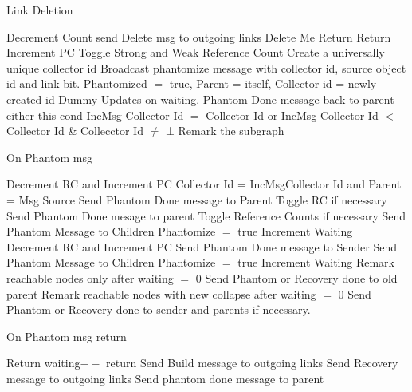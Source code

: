 \documentclass{article}
\begin{document}
\begin{algorithm}
\caption{Link Deletion}
\label{Link Deletion}
\begin{algorithmic}[1]
\State Decrement Count
\State send Delete msg to outgoing links
\EndIf
{}
\State Delete Me
\State Return
\State Return
\State Increment PC
\State Toggle Strong and Weak Reference Count
\State Create a universally unique collector id
\State Broadcast phantomize message with collector id, source object id and link bit.
\EndFor
\State Phantomized $=$ true, Parent = itself, Collector id = newly created id
\State Dummy Updates on waiting.
\State Phantom Done message back to parent
\EndIf
\Else 
\State either this cond {IncMsg Collector Id $=$ Collector Id} or {IncMsg Collector Id $<$ Collector Id \& Collecctor Id $\neq$ $\bot$}
\State Remark the subgraph
\EndIf
\EndProcedure
\end{algorithmic}
\end{algorithm}	

\begin{algorithm}
\caption{On Phantom msg}
\label{Phantom message received}
\begin{algorithmic}[1]
\State Decrement RC and Increment PC
\State Collector Id = IncMsgCollector Id and Parent = Msg Source
\State Send Phantom Done message to Parent
\State Toggle RC if necessary
\State Send Phantom Done mesage to parent
\Else
\State Toggle Reference Counts if necessary
\State Send Phantom Message to Children
\State Phantomize $=$ true
\State Increment Waiting
\EndIf
{}
\State Decrement RC and Increment PC
\State Send Phantom Done message to Sender
\Else
\State Send Phantom Message to Children
\State Phantomize $=$ true
\State Increment Waiting
\EndIf
{}
\State Remark reachable nodes only after waiting $=$ 0
\State Send Phantom or Recovery done to old parent
\Else
\State Remark reachable nodes with new collapse after waiting $=$ 0
\State Send Phantom or Recovery done to sender and parents if necessary.
\EndIf
\EndProcedure
\end{algorithmic}
\end{algorithm}	
	
	
\begin{algorithm}
\caption{On Phantom msg return}
\label{Phantom Done message received}
\begin{algorithmic}[1]
\State Return
\EndIf
\State waiting$--$
\State return
\EndIf
{}
\State Send Build message to outgoing links
\State Send Recovery message to outgoing links
\Else
\State Send phantom done message to parent
\EndIf
\EndProcedure
\end{algorithmic}
\end{algorithm}	
\end{document}
